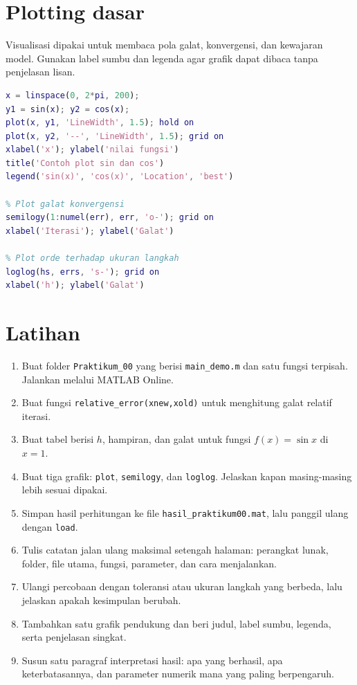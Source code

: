 \documentclass[book,english,noindex,lean,nobackpage,nocopyright,noupdate,nofiglist,notablist]{enacom}
\begin{document}
\section{Plotting dasar}
Visualisasi dipakai untuk membaca pola galat, konvergensi, dan kewajaran model. Gunakan label sumbu dan legenda agar grafik dapat dibaca tanpa penjelasan lisan.
\begin{lstlisting}[language=Matlab]
x = linspace(0, 2*pi, 200);
y1 = sin(x); y2 = cos(x);
plot(x, y1, 'LineWidth', 1.5); hold on
plot(x, y2, '--', 'LineWidth', 1.5); grid on
xlabel('x'); ylabel('nilai fungsi')
title('Contoh plot sin dan cos')
legend('sin(x)', 'cos(x)', 'Location', 'best')

% Plot galat konvergensi
semilogy(1:numel(err), err, 'o-'); grid on
xlabel('Iterasi'); ylabel('Galat')

% Plot orde terhadap ukuran langkah
loglog(hs, errs, 's-'); grid on
xlabel('h'); ylabel('Galat')
\end{lstlisting}

\section{Latihan}
\begin{enumerate}
\item Buat folder \texttt{Praktikum\_00} yang berisi \texttt{main\_demo.m} dan satu fungsi terpisah. Jalankan melalui MATLAB Online.
\item Buat fungsi \texttt{relative\_error(xnew,xold)} untuk menghitung galat relatif iterasi.
\item Buat tabel berisi $h$, hampiran, dan galat untuk fungsi $f(x)=\sin x$ di $x=1$.
\item Buat tiga grafik: \texttt{plot}, \texttt{semilogy}, dan \texttt{loglog}. Jelaskan kapan masing-masing lebih sesuai dipakai.
\item Simpan hasil perhitungan ke file \texttt{hasil\_praktikum00.mat}, lalu panggil ulang dengan \texttt{load}.
\item Tulis catatan jalan ulang maksimal setengah halaman: perangkat lunak, folder, file utama, fungsi, parameter, dan cara menjalankan.

\item Ulangi percobaan dengan toleransi atau ukuran langkah yang berbeda, lalu jelaskan apakah kesimpulan berubah.
\item Tambahkan satu grafik pendukung dan beri judul, label sumbu, legenda, serta penjelasan singkat.
\item Susun satu paragraf interpretasi hasil: apa yang berhasil, apa keterbatasannya, dan parameter numerik mana yang paling berpengaruh.

\end{enumerate}
\end{document}
